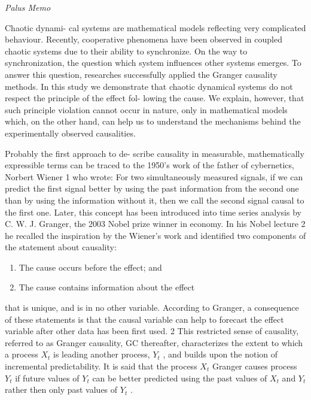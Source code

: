\documentclass[
]{book}
\begin{document}
\emph{Palus Memo}

Chaotic dynami-
cal systems are mathematical models reflecting
very complicated behaviour. Recently, cooperative
phenomena have been observed in coupled
chaotic systems due to their ability to synchronize.
On the way to synchronization, the question
which system influences other systems emerges.
To answer this question, researches successfully
applied the Granger causality methods. In this
study we demonstrate that chaotic dynamical systems
do not respect the principle of the effect fol-
lowing the cause. We explain, however, that such
principle violation cannot occur in nature, only in
mathematical models which, on the other hand,
can help us to understand the mechanisms behind
the experimentally observed causalities.

Probably the first approach to de-
scribe causality in measurable, mathematically expressible
terms can be traced to the 1950's work of the father
of cybernetics, Norbert Wiener 1 who wrote: For two
simultaneously measured signals, if we can predict the first
signal better by using the past information from the second one than by using the information without it, then we
call the second signal causal to the first one. Later, this
concept has been introduced into time series analysis by
C. W. J. Granger, the 2003 Nobel prize winner in economy.
In his Nobel lecture 2 he recalled the inspiration by
the Wiener's work and identified two components of the
statement about causality:

\begin{enumerate}
\def\labelenumi{\arabic{enumi}.}
\item
  The cause occurs before the effect; and
\item
  The cause contains information about the effect
\end{enumerate}

that is unique, and is in no other variable.
According to Granger, a consequence of these statements
is that the causal variable can help to forecast
the effect variable after other data has been first used. 2
This restricted sense of causality, referred to as Granger
causality, GC thereafter, characterizes the extent to
which a process \(X_t\) is leading another process, \(Y_t\) , and
builds upon the notion of incremental predictability. It
is said that the process \(X_t\) Granger causes process \(Y_t\) if
future values of \(Y_t\) can be better predicted using the past
values of \(X_t\) and \(Y_t\) rather then only past values of \(Y_t\) .
\end{document}
